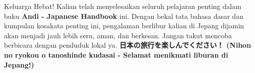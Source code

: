 \vspace{2em}
\begin{tcolorbox}[
    colback=green!5!white,
    colframe=green!60!black,
    boxrule=3pt,
    arc=5mm,
    title={\huge\bfseries \sffamily 🌸 Selesai! Selamat Berlibur! 🌸},
    fonttitle=\color{white},
    attach boxed title to top center={yshift=-4mm},
    boxed title style={colback=green!60!black, rounded corners},
    left=5mm, right=5mm, top=7mm, bottom=5mm
]
\Large Keluarga Hebat! Kalian telah menyelesaikan seluruh pelajaran penting dalam buku \textbf{Andi - Japanese Handbook} ini. Dengan bekal tata bahasa dasar dan kumpulan kosakata penting ini, pengalaman berlibur kalian di Jepang dijamin akan menjadi jauh lebih seru, aman, dan berkesan. Jangan takut mencoba berbicara dengan penduduk lokal ya. \textbf{日本の旅行を楽しんでください！ (Nihon no ryokou o tanoshinde kudasai - Selamat menikmati liburan di Jepang!)}
\end{tcolorbox}

\newpage